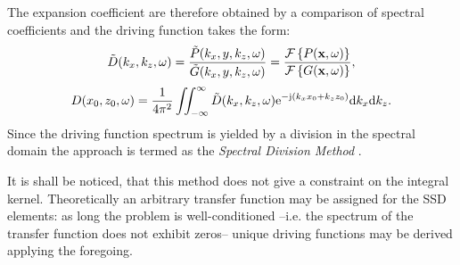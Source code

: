 The expansion coefficient are therefore obtained by a comparison of spectral coefficients and the driving function takes the form:
\begin{equation}
\tilde{D}(k_x,k_z,\omega) = \frac{\tilde{P}(k_x,y,k_z, \omega)}{ \tilde{G}(k_x,y,k_z, \omega)} = 
\frac{\mathcal{F}\left\{ P(\mathbf{x},\omega) \right\} }
{  \mathcal{F}\left\{ G(\mathbf{x},\omega) \right\} },
\end{equation}
\begin{equation}
D(x_0,z_0,\omega) = \frac{1}{4\pi^2} \iint_{-\infty}^{\infty} \tilde{D}(k_x,k_z, \omega) \mathrm{e}^{-\mathrm{j} (k_x x_0 + k_z z_0)} \mathrm{d} k_x \mathrm{d} k_z.
\label{Eq:Theory:Dkx_inverse_Fourier}
\end{equation}
Since the driving function spectrum is yielded by a division in the spectral domain the approach is termed as the \emph{Spectral Division Method} \cite{Ahrens2010a, Ahrens2012:Ambisonics_for_planar_linear, Ahrens2011:icassp, Ahrens2010:Ambisonics_w_planar_linear}.

It is shall be noticed, that this method does not give a constraint on the integral kernel. Theoretically an arbitrary transfer function may be assigned for the SSD elements: as long the problem is well-conditioned --i.e. the spectrum of the transfer function does not exhibit zeros-- unique driving functions may be derived applying the foregoing.

